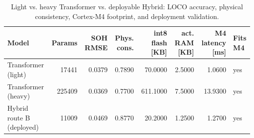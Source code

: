 \begin{table}
\caption{Light vs. heavy Transformer vs. deployable Hybrid: LOCO accuracy, physical consistency, Cortex-M4 footprint, and deployment validation.}
\label{tab:deployment_comparison}
\begin{tabular}{lrrrrrrl}
\toprule
Model & Params & SOH RMSE & Phys. cons. & int8 flash [KB] & act. RAM [KB] & M4 latency [ms] & Fits M4 \\
\midrule
Transformer (light) & 17441 & 0.0379 & 0.7890 & 70.0000 & 2.5000 & 1.0600 & yes \\
Transformer (heavy) & 225409 & 0.0369 & 0.7700 & 611.1000 & 7.5000 & 13.9300 & yes \\
Hybrid route B (deployed) & 11009 & 0.0469 & 0.8770 & 20.2000 & 1.2500 & 1.2700 & yes \\
\bottomrule
\end{tabular}
\end{table}
